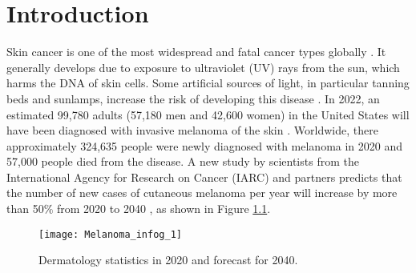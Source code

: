 

\chapter{Introduction}\label{ch:intro} 

Skin cancer is one of the most widespread and fatal cancer types globally \cite{karimkhani2017global}. It generally develops due to exposure to ultraviolet (UV) rays from the sun, which harms the DNA of skin cells. Some artificial sources of light, in particular tanning beds and sunlamps, increase the risk of developing this disease \cite{narayanan2010ultraviolet}. In 2022, an estimated 99,780 adults (57,180 men and 42,600 women) in the United States will have been diagnosed with invasive melanoma of the skin \cite{co2022american}. Worldwide, there approximately 324,635 people were newly diagnosed with melanoma in 2020 and 57,000 people died from the disease. A new study by scientists from the International Agency for Research on Cancer (IARC) and partners predicts that the number of new cases of cutaneous melanoma per year will increase by more than 50$\%$ from 2020 to 2040  \cite{world2022international}, as shown in Figure \ref{Fig:Mel1}. 

\begin{figure}
\centerline{
 \texttt{[image: Melanoma\_infog\_1]} 
 }
\caption{Dermatology statistics in 2020 and forecast for 2040\cite{world2022international}.}
\label{Fig:Mel1}
\end{figure}

